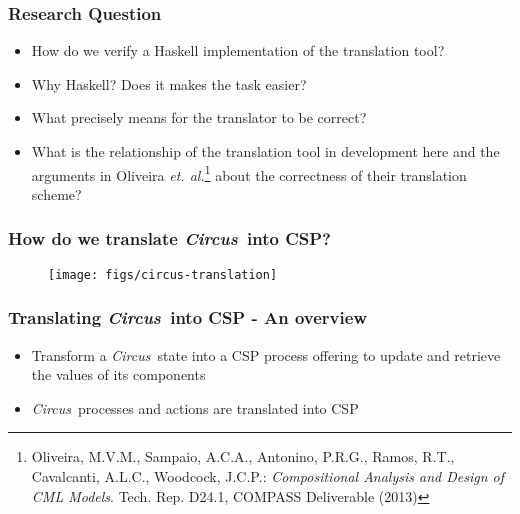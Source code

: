 \documentclass{beamer}
\def\Circus{{\sf\slshape{Circus}}}
\begin{document}
\begin{frame}
\frametitle{Research Question}
\begin{itemize}
  \item How do we verify a Haskell implementation of the translation tool?
  \item Why Haskell? Does it makes the task easier?
  \item What precisely means for the translator to be correct?
  \item What is the relationship of the translation tool in development here and the arguments in Oliveira \emph{et. al.}\footnote{Oliveira, M.V.M., Sampaio, A.C.A., Antonino, P.R.G., Ramos, R.T., Cavalcanti,
A.L.C., Woodcock, J.C.P.: \emph{Compositional Analysis and Design of CML Models}. Tech. Rep. D24.1, COMPASS Deliverable (2013)} about the correctness of their translation scheme?
\end{itemize}

\end{frame}

\begin{frame}
\frametitle{How do we translate \Circus\ into CSP?}

\begin{figure}[htbp]
  \centering
    \texttt{[image: figs/circus-translation]}
  \label{phd-table}
 \end{figure}
\end{frame}

\begin{frame}
\frametitle{Translating \Circus\ into CSP - An overview}
\begin{itemize}
  \item Transform a \Circus\ state into a CSP process offering to update and retrieve the values of its components
  \item \Circus\ processes and actions are translated into CSP
\end{itemize}
\end{frame}

\end{document}
